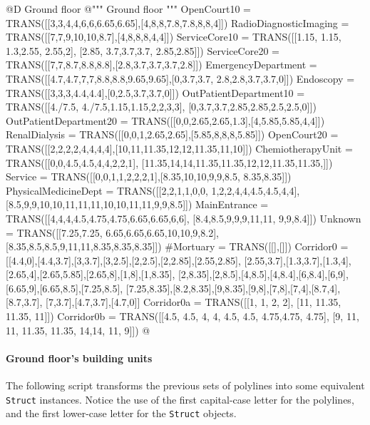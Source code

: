 \documentclass[11pt,oneside]{article}    %
\begin{document}
@D Ground floor 
@{""" Ground floor """
OpenCourt10 = TRANS([[3,3,4,4,6,6,6.65,6.65],[4,8,8,7.8,7.8,8,8,4]])
RadioDiagnosticImaging = TRANS([[7,7,9,10,10,8.7],[4,8,8,8,4,4]])
ServiceCore10 = TRANS([[1.15, 1.15, 1.3,2.55, 2.55,2], [2.85, 3.7,3.7,3.7, 
    2.85,2.85]])
ServiceCore20 = TRANS([[7,7,8.7,8.8,8.8],[2.8,3.7,3.7,3.7,2.8]])
EmergencyDepartment = TRANS([[4.7,4.7,7,7,8.8,8.8,9.65,9.65],[0,3.7,3.7,
    2.8,2.8,3.7,3.7,0]])
Endoscopy = TRANS([[3,3,3,4.4,4.4],[0,2.5,3.7,3.7,0]])
OutPatientDepartment10 = TRANS([[4./7.5, 4./7.5,1.15,1.15,2,2,3,3],
    [0,3.7,3.7,2.85,2.85,2.5,2.5,0]])
OutPatientDepartment20 = TRANS([[0,0,2.65,2.65,1.3],[4,5.85,5.85,4,4]])
RenalDialysis = TRANS([[0,0,1,2.65,2.65],[5.85,8,8,8,5.85]])
OpenCourt20 = TRANS([[2,2,2,2,4,4,4,4],[10,11,11.35,12,12,11.35,11,10]])
ChemiotherapyUnit = TRANS([[0,0,4.5,4.5,4,4,2,2,1],
    [11.35,14,14,11.35,11.35,12,12,11.35,11.35,]])
Service = TRANS([[0,0,1,1,2,2,2,1],[8.35,10,10,9,9,8.5, 8.35,8.35]])
PhysicalMedicineDept = TRANS([[2,2,1,1,0,0, 1,2,2,4,4,4.5,4.5,4,4],
    [8.5,9,9,10,10,11,11,11,10,10,11,11,9,9,8.5]])
MainEntrance = TRANS([[4,4,4,4.5,4.75,4.75,6.65,6.65,6,6],
    [8.4,8.5,9,9,9,11,11, 9,9,8.4]])
Unknown = TRANS([[7.25,7.25, 6.65,6.65,6.65,10,10,9,8.2],
    [8.35,8.5,8.5,9,11,11,8.35,8.35,8.35]])
#Mortuary = TRANS([[],[]])
Corridor0 = [[4.4,0],[4.4,3.7],[3,3.7],[3,2.5],[2,2.5],[2,2.85],[2.55,2.85],
    [2.55,3.7],[1.3,3.7],[1.3,4],[2.65,4],[2.65,5.85],[2.65,8],[1,8],[1,8.35],
    [2,8.35],[2,8.5],[4,8.5],[4,8.4],[6,8.4],[6,9],[6.65,9],[6.65,8.5],[7.25,8.5],
    [7.25,8.35],[8.2,8.35],[9,8.35],[9,8],[7,8],[7,4],[8.7,4],[8.7,3.7],
    [7,3.7],[4.7,3.7],[4.7,0]]
Corridor0a = TRANS([[1, 1, 2, 2], [11, 11.35, 11.35, 11]])
Corridor0b = TRANS([[4.5, 4.5, 4, 4, 4.5, 4.5, 4.75,4.75, 4.75],
    [9, 11, 11, 11.35, 11.35, 14,14, 11, 9]])
@}



\paragraph{Ground floor's building units}

The following script transforms the previous sets of polylines into some equivalent \texttt{Struct} instances.
Notice the use of the first capital-case letter for the polylines, and the first lower-case letter for the \texttt{Struct} objects.
\end{document}
